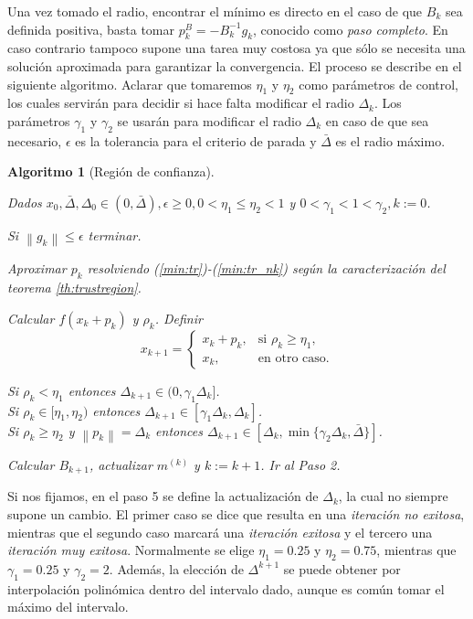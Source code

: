 \documentclass[11pt,a4paper]{book}
\newtheorem{algorithm}[theorem]{Algoritmo}
\theoremstyle{definition}
\theoremstyle{remark}
\newcommand{\norm}[1]{\left\lVert#1\right\rVert}
\begin{document}
Una vez tomado el radio, encontrar el mínimo es directo en el caso de que $B_k$ sea definida
positiva, basta tomar $p_k^B = -B_k^{-1}g_k$, conocido como \textit{paso completo}. En caso
contrario tampoco supone una tarea muy costosa ya que sólo se necesita una solución aproximada
para garantizar la convergencia. El proceso se describe en el siguiente algoritmo.
Aclarar que tomaremos $\eta_1$ y $\eta_2$ como parámetros de control,
los cuales servirán para decidir si hace falta modificar el radio $\Delta_k$. Los parámetros
$\gamma_1$ y $\gamma_2$ se usarán para modificar el radio $\Delta_k$ en caso de que sea necesario,
$\epsilon$ es la tolerancia para el criterio de parada y $\bar{\Delta}$ es el radio máximo.

\begin{algorithm}[Región de confianza] \leavevmode
	\label{alg:tr}
	\begin{steps}
		\item Dados $x_0, \bar{\Delta}, \Delta_0 \in (0, \bar{\Delta}), \epsilon \geq
			0, 0<\eta_1\leq\eta_2<1$ y $0<\gamma_1<1<\gamma_2, k:=0$.
		\item Si $\norm{g_k} \leq \epsilon$ terminar.
		\item Aproximar $p_k$ resolviendo (\ref{min:tr})-(\ref{min:tr_nk}) según la caracterización del teorema \ref{th:trustregion}.
		\item Calcular $f(x_k+p_k)$ y $\rho_k$. Definir
			\begin{equation*}
				x_{k+1} = \begin{cases}
					x_k + p_k, & \text{si } \rho_k \geq \eta_1, \\
					x_k, & \text{en otro caso.}
				\end{cases}
			\end{equation*}
		\item Si $\rho_k < \eta_1$ entonces $\Delta_{k+1} \in (0,\gamma_1 \Delta_k]$. \\
			Si $\rho_k \in [\eta_1, \eta_2)$ entonces $\Delta_{k+1} \in [\gamma_1 \Delta_k,\Delta_k]$. \\
			Si $\rho_k \geq \eta_2$ y $\norm{p_k}=\Delta_k$ entonces
			$\Delta_{k+1} \in [\Delta_k, \min \{\gamma_2 \Delta_k,\bar{\Delta}\}]$.
		\item Calcular $B_{k+1}$, actualizar $m^{(k)}$ y $k:=k+1$. Ir al Paso 2.
	\end{steps}
\end{algorithm}
Si nos fijamos, en el paso 5 se define la actualización de $\Delta_k$, la cual no siempre supone un cambio.
El primer caso se dice que resulta en una \textit{iteración no exitosa}, mientras que el segundo caso marcará
una \textit{iteración exitosa} y el tercero una \textit{iteración muy exitosa}.
Normalmente se elige $\eta_1 = 0.25$ y $\eta_2 = 0.75$, mientras que $\gamma_1 = 0.25$ y $\gamma_2 = 2$.
Además, la elección de $\Delta^{k+1}$ se puede obtener por interpolación polinómica dentro del
intervalo dado,
aunque es común tomar el máximo del intervalo.
\end{document}
